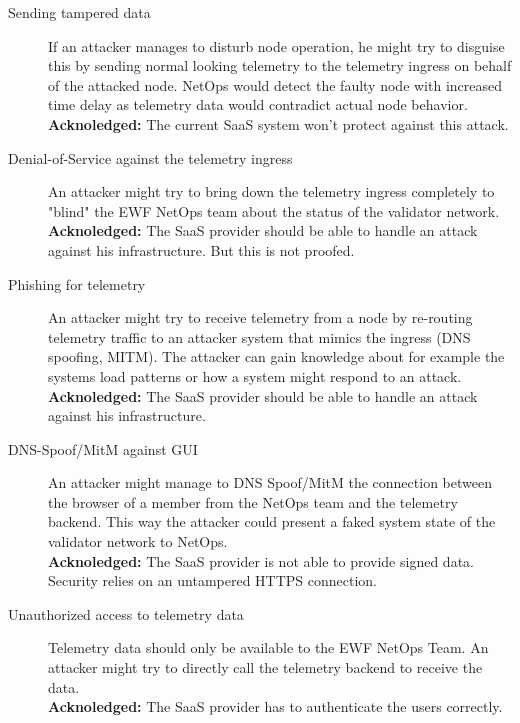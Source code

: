 \begin{description}
    \item[Sending tampered data] 
        If an attacker manages to disturb node operation, he might try to disguise this by sending normal looking telemetry to the telemetry ingress on behalf of the attacked node. NetOps would detect the faulty node with increased time delay as telemetry data would contradict actual node behavior. \\
        \textbf{Acknoledged:} The current SaaS system won't protect against this attack. 
    
    \item[Denial-of-Service against the telemetry ingress] 
        An attacker might try to bring down the telemetry ingress completely to "blind" the EWF NetOps team about the status of the validator network. \\
        \textbf{Acknoledged:} The SaaS provider should be able to handle an attack against his infrastructure. But this is not proofed.

    \item[Phishing for telemetry] 
        An attacker might try to receive telemetry from a node by re-routing telemetry traffic to an attacker system that mimics the ingress (DNS spoofing, MITM). The attacker can gain knowledge about for example the systems load patterns or how a system might respond to an attack. \\
        \textbf{Acknoledged:} The SaaS provider should be able to handle an attack against his infrastructure.
        
    \item[DNS-Spoof/MitM against GUI] 
        An attacker might manage to DNS Spoof/MitM the connection between the browser of a member from the NetOps team and the telemetry backend. This way the attacker could present a faked system state of the validator network to NetOps. \\
        \textbf{Acknoledged:} The SaaS provider is not able to provide signed data. Security relies on an untampered HTTPS connection.

    \item[Unauthorized access to telemetry data]
        Telemetry data should only be available to the EWF NetOps Team. An attacker might try to directly call the telemetry backend to receive the data. \\
        \textbf{Acknoledged:} The SaaS provider has to authenticate the users correctly.

\end{description}

